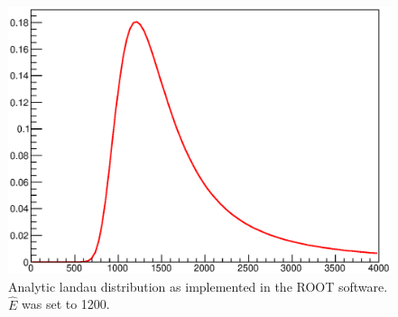 	\begin{figure}[H]
	\centering
		\includegraphics[width = 0.9 \textwidth]{graphics/cosmicRays/TMathLandauRoot.eps}
		\caption[Landau distribution]{Analytic landau distribution as implemented in the ROOT software. $\hat E$ was set to 1200.}
		\label{fig:Introduction:landauDistribution}
	\end{figure}

    
   